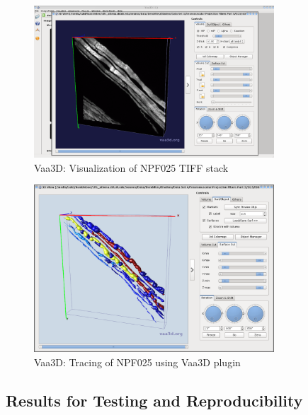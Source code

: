 \documentclass{beamer}
\begin{document}
\begin{frame}%
\begin{figure}[H]
\centering
\includegraphics[width=0.8\textwidth]{gfx/vaa3d_DIADEM-NPF-3-025_3D-view}
\caption{Vaa3D: Visualization of NPF025 TIFF stack}
\end{figure}
\end{frame}

\begin{frame}%
\begin{figure}[H]
\centering
\includegraphics[width=0.8\textwidth]{gfx/vaa3d_DIADEM-NPF-3-025_APP2-tracing-3D-view}
\caption{Vaa3D: Tracing of NPF025 using Vaa3D plugin}
\end{figure}
\end{frame}

\subsection{Results for Testing and Reproducibility}
\end{document}

